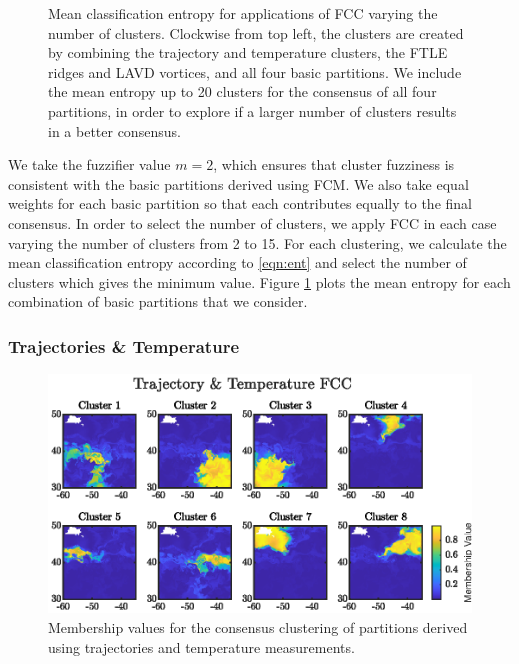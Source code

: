 \documentclass[a4paper, fontsize=12pt]{article}
\begin{document}
\begin{figure}
\begin{center}
	\caption{Mean classification entropy for applications of FCC varying the number of clusters. Clockwise from top left, the clusters are created by combining the trajectory and temperature clusters, the FTLE ridges and LAVD vortices, and all four basic partitions. We include the mean entropy up to 20 clusters for the consensus of all four partitions, in order to explore if a larger number of clusters results in a better consensus.}
	\label{fig:cons_ents}
\end{center}
\end{figure}

We take the fuzzifier value \(m = 2\), which ensures that cluster fuzziness is consistent with the basic partitions derived using FCM. We also take equal weights for each basic partition so that each contributes equally to the final consensus. In order to select the number of clusters, we apply FCC in each case varying the number of clusters from 2 to 15. For each clustering, we calculate the mean classification entropy according to \eqref{eqn:ent} and select the number of clusters which gives the minimum value. Figure \ref{fig:cons_ents} plots the mean entropy for each combination of basic partitions that we consider.


\subsubsection{Trajectories \& Temperature}
\begin{figure}
\begin{center}
	\includegraphics[scale = 1.3]{../figures/atlantic_member_trajtemp.eps}
	\caption{Membership values for the consensus clustering of partitions derived using trajectories and temperature measurements.}
	\label{fig:member_cons_trajtemp}
\end{center}
\end{figure}
\end{document}
